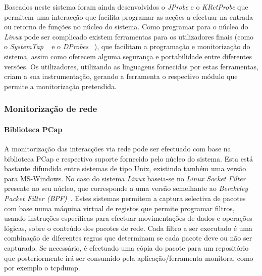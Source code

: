 \documentclass[a4paper]{llncs}
\newcommand{\td}[1]{\todo[inline]{#1}}
\begin{document}
 Baseados neste sistema foram ainda desenvolvidos o \textit{JProbe} e o \textit{KRetProbe} que permitem uma interacção que facilita programar as acções a efectuar na entrada ou retorno de funções no núcleo do sistema.
 Como programar para o núcleo do \textit{Linux} pode ser complicado existem ferramentas para os utilizadores finais (como o \textit{SystemTap} ~\cite{Jones2009} e o \textit{DProbes} ~\cite{:DProbes}),  que facilitam a programação e monitorização do sistema, assim como oferecem alguma segurança e portabilidade entre diferentes  versões. Os utilizadores, utilizando as linguagens fornecidas por estas ferramentas, criam a sua instrumentação, gerando a ferramenta o respectivo módulo que permite a monitorização pretendida.

\subsubsection{Monitorização de rede}
\label{subsub:mon_network__with_dynamic_filters_linux}

%
%
%
%

\paragraph{Biblioteca PCap\\}

A monitorização das interacções via rede pode ser efectuado com base na biblioteca PCap e respectivo suporte fornecido pelo núcleo do sistema. Esta está bastante difundida entre sistemas de tipo Unix, existindo também uma versão para MS-Windows.
No caso do sistema \textit{Linux} baseia-se no \textit{Linux Socket Filter} presente no seu núcleo, que corresponde a uma versão semelhante ao \textit{Berckeley Packet Filter (BPF)}~\cite{Mccanne92thebsd}. Estes sistemas permitem a captura selectiva de pacotes com base numa máquina virtual de registos que permite programar filtros, usando instruções específicas para efectuar movimentações de dados e operações lógicas, sobre o conteúdo dos pacotes de rede. Cada filtro a ser executado é uma combinação de diferentes regras que determinam se cada pacote deve ou não ser capturado. Se necessário, é efectuado uma cópia do pacote para um repositório que posteriormente irá ser consumido pela aplicação/ferramenta monitora, como por exemplo o tcpdump.
\end{document}
